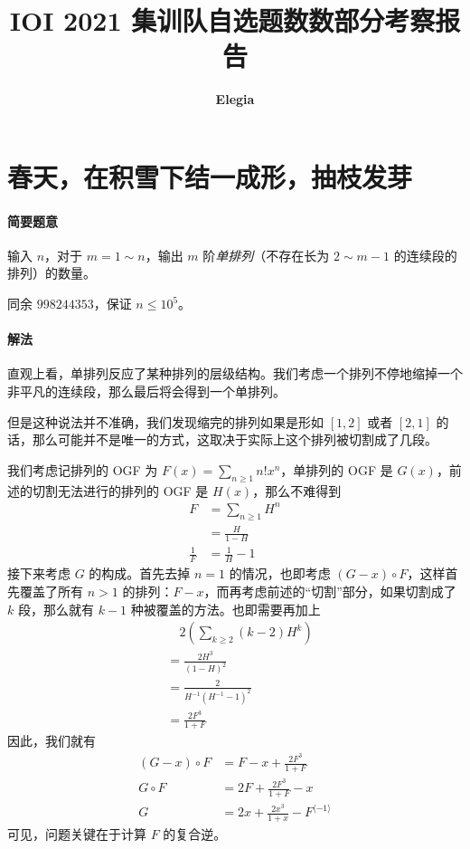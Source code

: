 \documentclass[12pt]{ctexart}
\title{\textbf{IOI 2021 集训队自选题数数部分考察报告}}
\author{\textbf{Elegia}}
\date{}
\theoremstyle{theorem}
\theoremstyle{theorem}
\begin{document}
\maketitle

\tableofcontents

\newpage

\section{春天，在积雪下结一成形，抽枝发芽}

\paragraph{简要题意} 输入 $n$，对于 $m=1\sim n$，输出 $m$ 阶\emph{单排列}（不存在长为 $2\sim m-1$ 的连续段的排列）的数量。

同余 $998244353$，保证 $n\le 10^5$。

\paragraph{解法}

直观上看，单排列反应了某种排列的层级结构。我们考虑一个排列不停地缩掉一个非平凡的连续段，那么最后将会得到一个单排列。

但是这种说法并不准确，我们发现缩完的排列如果是形如 $[1,2]$ 或者 $[2,1]$ 的话，那么可能并不是唯一的方式，这取决于实际上这个排列被切割成了几段。

我们考虑记排列的 OGF 为 $F(x) = \sum_{n\ge 1} n!x^n$，单排列的 OGF 是 $G(x)$，前述的切割无法进行的排列的 OGF 是 $H(x)$，那么不难得到
\begin{align*}
F &= \sum_{n\ge 1}H^n\\
&= \frac{H}{1-H}\\
\frac 1F &= \frac 1H - 1
\end{align*}
接下来考虑 $G$ 的构成。首先去掉 $n=1$ 的情况，也即考虑 $(G - x) \circ F$，这样首先覆盖了所有 $n>1$ 的排列：$F -x$，而再考虑前述的“切割”部分，如果切割成了 $k$ 段，那么就有 $k-1$ 种被覆盖的方法。也即需要再加上
\begin{align*}
&\quad 2\left(\sum_{k\ge 2} (k-2)H^k\right)\\
& = \frac{2H^3}{(1-H)^2}\\
&= \frac 2{H^{-1}(H^{-1}-1)^2}\\
&= \frac {2F^3}{1+F}
\end{align*}
因此，我们就有
\begin{align*}
(G - x) \circ F &= F - x + \frac {2F^3}{1+F}\\
G \circ F &= 2F + \frac{2F^3}{1+F} - x\\
G &= 2x + \frac{2x^3}{1+x} - F^{\langle -1 \rangle}
\end{align*}
可见，问题关键在于计算 $F$ 的复合逆。
\end{document}
